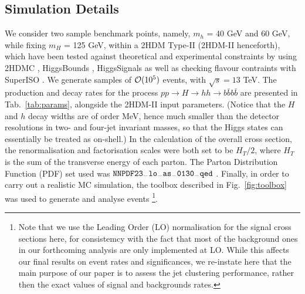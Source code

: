 \documentclass[12pt]{article}
\begin{document}
\subsection{Simulation Details}
We consider two sample benchmark points, namely, $m_{h}$ = 40 GeV and 60 GeV, while  fixing $m_{H}$ = 125 GeV, within a 2HDM Type-II (2HDM-II henceforth), which have been tested against theoretical and experimental constraints by
using 2HDMC \cite{Eriksson:2010zzb}, HiggsBounds \cite{Bechtle:2013wla}, HiggsSignals \cite{Bechtle:2013xfa} as well as checking flavour contraints with SuperISO \cite{Mahmoudi:2009zz}. {We generate samples of ${\cal O}(10^5)$ events, with $\sqrt{s}=13 $ TeV.} The production and decay rates for the process $pp\to H\to hh\to b\bar b b\bar b$
are presented in Tab.~\ref{tab:params}, alongside the 2HDM-II input parameters. (Notice that the $H$ and $h$ decay widths are of order MeV, hence much smaller than the detector resolutions in two- and four-jet invariant masses, so that the Higgs states can essentially be treated as on-shell.) In the calculation of  the overall cross section, the  renormalisation and factorisation scales
were both set to be $H_{T}/2$, where $H_T$ is the sum of the transverse energy
of each parton. The Parton Distribution Function (PDF)  set  used was ${\tt NNPDF23_{\bf -}lo_{\bf -}as_{\bf -}0130_{\bf -}qed}$ \cite{Ball:2014uwa}.
Finally,
in order to carry out a realistic MC simulation, the toolbox described in Fig.~\ref{fig:toolbox} was used to generate and analyse events \cite{Alwall:2014hca,Sjostrand:2007gs,Conte:2012fm,Conte:2018vmg}\footnote{Note that we use the Leading Order (LO) normalisation for the signal cross sections here, for consistemcy with the fact that most of the  background ones  in our forthcoming analysis are only implemented at LO. While this affects our  final results on event rates and significances, we re-instate here that the main purpose of our paper is to assess the jet clustering performance, rather then the exact values of signal and backgrounds rates.}.

\begin{table}[!h]
\begin{center}
\hspace*{-1.35truecm}
\caption{\label{tab:params} The 2HDM-II  parameters and cross sections of the process  in Fig. \ref{fig:diagram} used here. Note that in both cases we fix $\lambda_6 = \lambda_7 = 0$, $m_{12}^2 = 4000$, $\tan\beta = 1.6$, $\sin (\beta - \alpha )$, and $m_H = 125$GeV (in line with the SM Higgs).}
\end{center}
\end{table}
\end{document}
